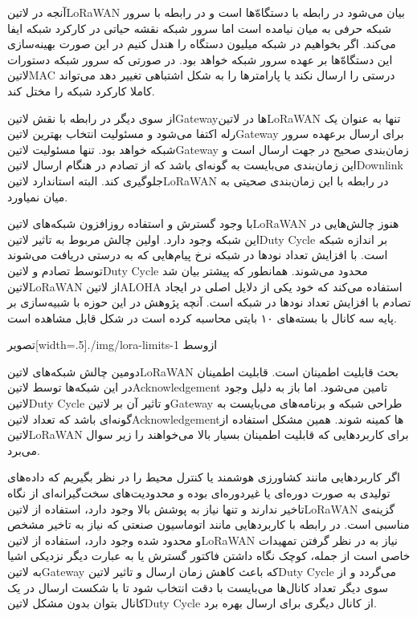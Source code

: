 آنجه در ‌لاتین{LoRaWAN} بیان می‌شود در رابطه با دستگاه‌ّها است و در رابطه با سرور شبکه حرفی به میان نیامده است اما سرور شبکه نقشه حیاتی در کارکرد شبکه ایفا می‌کند.
اگر بخواهیم در شبکه میلیون دستگاه را هندل کنیم در این صورت بهینه‌سازی این دستگاه‌ّها بر عهده سرور شبکه خواهد بود. در صورتی که سرور شبکه دستورات ‌لاتین{MAC}
درستی را ارسال نکند یا پارامترها را به شکل اشتباهی تغییر دهد می‌تواند کاملا کارکرد شبکه را مختل کند.

از سوی دیگر در رابطه با نقش ‌لاتین{Gateway}ها در ‌لاتین{LoRaWAN} تنها به عنوان یک رله اکتفا می‌شود و مسئولیت انتخاب بهترین ‌لاتین{Gateway} برای ارسال
برعهده سرور شبکه خواهد بود. تنها مسئولیت ‌لاتین{Gateway} زمان‌بندی صحیح در جهت ارسال است و این زمان‌بندی می‌بایست به گونه‌ای باشد که از تصادم در هنگام ارسال
‌لاتین{Downlink} جلوگیری کند. البته استاندارد ‌لاتین{LoRaWAN} در رابطه با این زمان‌بندی صحیتی به میان نمیاورد.


با وجود گسترش و استفاده روزافزون شبکه‌های ‌لاتین{LoRaWAN} هنوز چالش‌هایی در این شبکه وجود دارد. اولین چالش مربوط به تاثیر
‌لاتین{Duty Cycle} بر اندازه شبکه است. با افزایش تعداد نودها در شبکه نرخ پیام‌هایی که به درستی دریافت می‌شوند توسط تصادم و
‌لاتین{Duty Cycle} محدود می‌شوند. همانطور که پیشتر بیان شد ‌لاتین{LoRaWAN} از ‌لاتین{ALOHA} استفاده می‌کند
که خود یکی از دلایل اصلی در ایجاد تصادم با افزایش تعداد نودها در شبکه است. آنچه پژوهش  در این حوزه
با شبیه‌سازی بر پایه سه کانال با بسته‌های ۱۰ بایتی محاسبه کرده است در شکل  قابل مشاهده است.

‌تصویر[width=.5\textwidth]{./img/lora-limits-1}
‌ازوسط

دومین چالش شبکه‌های ‌لاتین{LoRaWAN} بحث قابلیت اطمینان است. قابلیت اطمینان در این شبکه‌ها توسط ‌لاتین{Acknowledgement} تامین می‌شود.
اما باز به دلیل وجود ‌لاتین{Duty Cycle} و تاثیر آن بر ‌لاتین{Gateway} طراحی شبکه و برنامه‌های می‌بایست به گونه‌ای باشد که تعداد ‌لاتین{Acknowledgement}ها کمینه شوند.
همین مشکل استفاده از ‌لاتین{LoRaWAN} برای کاربردهایی که قابلیت اطمینان بسیار بالا می‌خواهند را زیر سوال می‌برد.

اگر کاربردهایی مانند کشاورزی هوشمند یا کنترل محیط را در نظر بگیریم که داده‌های تولیدی به صورت دوره‌ای یا غیردوره‌ای بوده و محدودیت‌های سخت‌گیرانه‌ای از نگاه تاخیر ندارند و تنها نیاز به پوشش بالا وجود دارد،
استفاده از ‌لاتین{LoRaWAN} گزینه‌ی مناسبی است. در رابطه با کاربردهایی مانند اتوماسیون صنعتی که نیاز به تاخیر مشخص و محدود شده وجود دارد، استفاده از ‌لاتین{LoRaWAN} نیاز به در نظر گرفتن تمهیدات
خاصی است از جمله، کوچک نگاه داشتن فاکتور گسترش یا به عبارت دیگر نزدیکی اشیا به ‌لاتین{Gateway} که باعث کاهش زمان ارسال و تاثیر ‌لاتین{Duty Cycle} می‌گردد و از سوی دیگر تعداد کانال‌ها می‌بایست
با دقت انتخاب شود تا با شکست ارسال در یک کانال بتوان بدون مشکل ‌لاتین{Duty Cycle} از کانال دیگری برای ارسال بهره برد.

